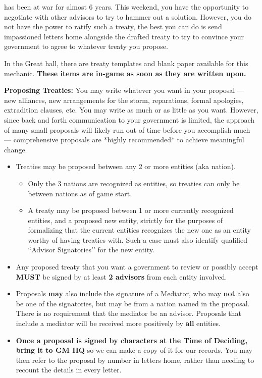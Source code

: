 \documentclass[green]{GL2020}
\begin{document}
\name{\gTreaty{}}

\pEarth{} has been at war for almost 6 years. This weekend, you have the opportunity to negotiate with other advisors to try to hammer out a solution. However, you do not have the power to ratify such a treaty, the best you can do is send impassioned letters home alongside the drafted treaty to try to convince your government to agree to whatever treaty you propose. 

In the Great hall, there are treaty templates and blank paper available for this mechanic. \textbf{These items are in-game as soon as they are written upon.}

\textbf{Proposing Treaties:}
You may write whatever you want in your proposal — new alliances, new arrangements for the storm, reparations, formal apologies, extradition clauses, etc. You may write as much or as little as you want. However, since back and forth communication to your government is limited, the approach of many small proposals will likely run out of time before you accomplish much — comprehensive proposals are *highly recommended* to achieve meaningful change.
\begin{itemize}
  \item Treaties may be proposed between any 2 or more entities (aka nation). 
  \begin{itemize}
    \item Only the 3 nations are recognized as entities, so treaties can only be between nations as of game start.
    \item A treaty may be proposed between 1 or more currently recognized entities, and a proposed new entity, strictly for the purposes of formalizing that the current entities recognizes the new one as an entity worthy of having treaties with. Such a case must also identify qualified ``Advisor Signatories’’ for the new entity.
  \end{itemize}
  \item Any proposed treaty that you want a government to review or possibly accept \textbf{MUST} be signed by at least \textbf{2 advisors} from each entity involved.
  \item Proposals \textbf{may} also include the signature of a Mediator, who may \textbf{not} also be one of the signatories, but may be from a nation named in the proposal. There is no requirement that the mediator be an advisor. Proposals that include a mediator will be received more positively by \textbf{all} entities.
  \item \textbf{Once a proposal is signed by characters at the Time of Deciding, bring it to GM HQ} so we can make a copy of it for our records. You may then refer to the proposal by number in letters home, rather than needing to recount the details in every letter.
\end{itemize}
\end{document}
